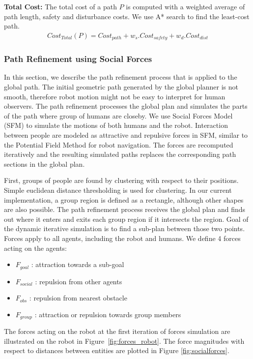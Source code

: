 \textbf{Total Cost:} The total cost of a path $P$ is computed with a weighted average of path length, safety and disturbance costs. We use A* search to find the least-cost path.
\begin{align}
Cost_{Total}(P) = Cost_{path}+w_{s}.Cost_{safety} + w_d.Cost_{dist}
\end{align}

\subsubsection{Path Refinement using Social Forces}
\label{sec:navigation_path_refinement}

In this section, we describe the path refinement process that is applied to the global path. The initial geometric path generated by the global planner is not smooth, therefore robot motion might not be easy to interpret for human observers. The path refinement processes the global plan and simulates the parts of the path where group of humans are closeby. We use Social Forces Model (SFM) \cite{helbing1995social} to simulate the motions of both humans and the robot. Interaction between people are modeled as attractive and repulsive forces in SFM, similar to the Potential Field Method \cite{khatib1986real} for robot navigation. The forces are recomputed iteratively and the resulting simulated paths replaces the corresponding path sections in the global plan.

First, groups of people are found by clustering with respect to their positions. Simple euclidean distance thresholding is used for clustering. In our current implementation, a group region is defined as a rectangle, although other shapes are also possible. The path refinement process receives the global plan and finds out where it enters and exits each group region if it intersects the region. Goal of the dynamic iterative simulation is to find a sub-plan between those two points. Forces apply to all agents, including the robot and humans. We define 4 forces acting on the agents:
\begin{itemize}
  \item $F_{goal}$ : attraction towards a sub-goal
  \item $F_{social}$ : repulsion from other agents
  \item $F_{obs}$ : repulsion from nearest obstacle
  \item $F_{group}$ : attraction or repulsion towards group members
\end{itemize}
The forces acting on the robot at the first iteration of forces simulation are illustrated on the robot in Figure~\ref{fig:forces_robot}. The force magnitudes with respect to distances between entities are plotted in Figure \ref{fig:socialforces}. 

